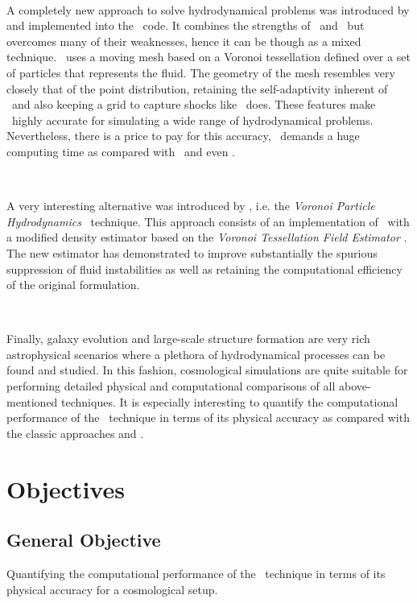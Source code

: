 \documentclass[a4,useAMS,usenatbib,usegraphicx,12pt]{article}
\begin{document}
\

A completely new approach to solve hydrodynamical problems was introduced by 
\citet{Springel10} and implemented into the \AREPO\ code. It combines the 
strengths of \AMR\ and \SPH\ but overcomes many of their weaknesses, hence it 
can be though as a mixed technique. \AREPO\ uses a moving mesh based on a 
Voronoi tessellation defined over a set of particles that represents the fluid. 
The geometry of the mesh resembles very closely that of the point distribution,
retaining the self-adaptivity inherent of \SPH\ and also keeping a grid to 
capture shocks like \AMR\ does. These features make \AREPO\ highly accurate for
simulating a wide range of hydrodynamical problems. Nevertheless, there is a 
price to pay for this accuracy, \AREPO\ demands a huge computing time as 
compared with \SPH\ and even \AMR.

\

A very interesting alternative was introduced by \citet{Hess10}, i.e. the 
\textit{Voronoi Particle Hydrodynamics} \VPH\ technique. This approach consists
of an implementation of \SPH\ with a modified density estimator based on the  
\textit{Voronoi Tessellation Field Estimator} \VTFE. The new estimator
has demonstrated to improve substantially the spurious suppression of fluid 
instabilities as well as retaining the computational efficiency of the original 
formulation.

\

Finally, galaxy evolution and large-scale structure formation are very rich 
astrophysical scenarios where a plethora of hydrodynamical processes can be 
found and studied. In this fashion, cosmological simulations are quite suitable 
for performing detailed physical and computational comparisons of all 
above-mentioned techniques. It is especially interesting to quantify the 
computational performance of the \VPH\ technique in terms of its physical 
accuracy as compared with the classic approaches and \AREPO.


\section{Objectives}
\subsection*{General Objective}
Quantifying the computational performance of the \VPH\ technique in terms of 
its physical accuracy for a cosmological setup.
\end{document}
